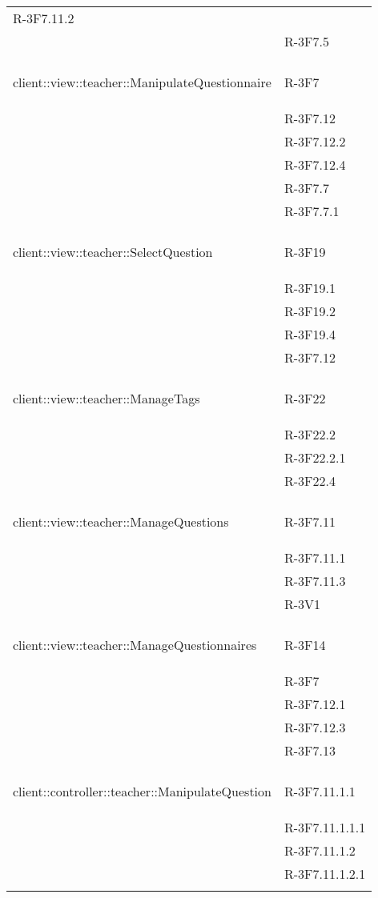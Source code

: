 \begin{longtable}{l p{3cm}}
	R-3F7.11.2 \tabularnewline &
	
	R-3F7.5 \tabularnewline &\tabularnewline
	\hline
	\hypertarget{client::view::teacher::ManipulateQuestionnaire}{client::view::teacher::ManipulateQuestionnaire} & R-3F7 \tabularnewline &
	
	R-3F7.12 \tabularnewline &
	
	R-3F7.12.2 \tabularnewline &
	
	R-3F7.12.4 \tabularnewline &
	
	R-3F7.7 \tabularnewline &
	
	R-3F7.7.1 \tabularnewline &\tabularnewline
	\hline
	\hypertarget{client::view::teacher::SelectQuestion}{client::view::teacher::SelectQuestion} & R-3F19 \tabularnewline &
	
	R-3F19.1 \tabularnewline &
	
	R-3F19.2 \tabularnewline &
	
	R-3F19.4 \tabularnewline &
	
	R-3F7.12 \tabularnewline &\tabularnewline
	\hline
	\hypertarget{client::view::teacher::ManageTags}{client::view::teacher::ManageTags} & R-3F22 \tabularnewline &
	
	R-3F22.2 \tabularnewline &
	
	R-3F22.2.1 \tabularnewline &
	
	R-3F22.4 \tabularnewline &\tabularnewline
	\hline
	\hypertarget{client::view::teacher::ManageQuestions}{client::view::teacher::ManageQuestions} & R-3F7.11 \tabularnewline &
	
	R-3F7.11.1 \tabularnewline &
	
	R-3F7.11.3 \tabularnewline &
	
	R-3V1 \tabularnewline &\tabularnewline
	\hline
	\hypertarget{client::view::teacher::ManageQuestionnaires}{client::view::teacher::ManageQuestionnaires} & R-3F14 \tabularnewline &
	
	R-3F7 \tabularnewline &
	
	R-3F7.12.1 \tabularnewline &
	
	R-3F7.12.3 \tabularnewline &
	
	R-3F7.13 \tabularnewline &\tabularnewline
	\hline
	\hypertarget{client::controller::teacher::ManipulateQuestion}{client::controller::teacher::ManipulateQuestion} & R-3F7.11.1.1 \tabularnewline &
	
	R-3F7.11.1.1.1 \tabularnewline &
	
	R-3F7.11.1.2 \tabularnewline &
	
	R-3F7.11.1.2.1 \tabularnewline &
	

\end{longtable}
